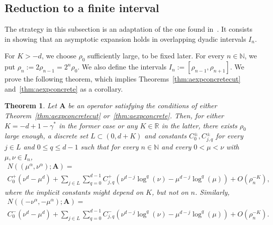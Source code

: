 \documentclass[10pt]{amsart}
\newtheorem{theo}{Theorem}[section]
\theoremstyle{definition}\newtheorem{defi}[theo]{Definition}\newtheorem{rema}[theo]{Remark}\newtheorem{exam}[theo]{Example}\newtheorem{nota}[theo]{Notation}
\newcommand{\R}{\mathbb R}
\newcommand{\N}{\mathbb N}
\newcommand{\BA}{\mathbf A}
\newcommand{\bigo}[1]{O\left(#1 \right)}
\begin{document}
\subsection{Reduction to a finite interval}

The strategy in this subsection is an adaptation of the one found in~\cite{MorParSht2014,ParSht2012}. It consists in showing that an asymptotic expansion holds in overlapping dyadic intervals $I_n$.

For $K > -d$, we choose $\rho_0$ sufficiently large, to be fixed later. For every $n \in \N$, we put $\rho_n := 2 \rho_{n-1} = 2^n \rho_0$. We also define the intervals $I_n := [\rho_{n-1},\rho_{n+1}]$. We prove the following theorem, which implies Theorems~\ref{thm:aexpconcretecut} and~\ref{thm:aexpconcrete} as a corollary.
\begin{theo} \label{thm:ainint}
Let $\BA$ be an operator satisfying the conditions of either Theorem~\ref{thm:aexpconcretecut} or~\ref{thm:aexpconcrete}. Then, for either $K = -d + 1 - \gamma^*$ in the former case or any $K \in \R$ in the latter, there exists $\rho_0$ large enough, a discrete set $L \subset (0,d+K)$ and constants $C_0^\pm, C^\pm_{j,q}$ for every $j \in L$ and $0
\le q \le d-1$ such that for every $n \in \N$ and every $0 < \mu < \nu$ with $\mu, \nu \in I_n$,
\begin{multline}\label{eq:ainint}
N((\mu^\alpha,\nu^\alpha);\BA) =\\
C_0^+(\nu^d - \mu^d) +
\sum_{j\in L}\sum_{q =0}^{d-1} C_{j,q}^+
\left(\nu^{d-j} \log^q(\nu) - \mu^{d-j} \log^q(\mu)\right) + \bigo{\rho_n^{-K}},
\end{multline}
where the implicit constants might depend on $K$, but not on $n$. Similarly,
\begin{multline}\label{eq:ainintneg}
N((-\nu^\alpha,-\mu^\alpha);\BA) =\\
 C_0^- (\nu^d - \mu^d) +
\sum_{j\in L}\sum_{q =0}^{d-1} C_{j,q}^-
\left(\nu^{d-j} \log^q(\nu) - \mu^{d-j} \log^q(\mu)\right) +
\bigo{\rho_n^{-K}}.
\end{multline}
\end{theo}
\end{document}

